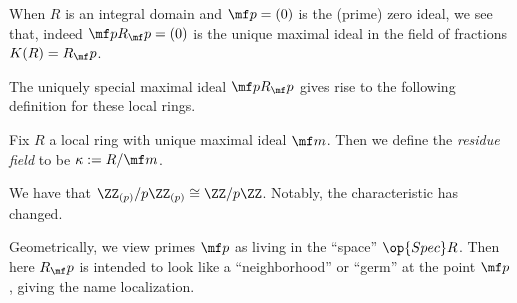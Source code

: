 \begin{example}
	When $R$ is an integral domain and $\mf p=(0)$ is the (prime) zero ideal, we see that, indeed $\mf pR_\mf p=(0)$ is the unique maximal ideal in the field of fractions $K(R)=R_\mf p$.
\end{example}
The uniquely special maximal ideal $\mf pR_\mf p$ gives rise to the following definition for these local rings.
\begin{definition}
	Fix $R$ a local ring with unique maximal ideal $\mf m$. Then we define the \textit{residue field} to be $\kappa:=R/\mf m$.
\end{definition}
\begin{example}
	We have that $\ZZ_{(p)}/p\ZZ_{(p)}\cong\ZZ/p\ZZ$. Notably, the characteristic has changed.
\end{example}
\begin{remark}
	Geometrically, we view primes $\mf p$ as living in the ``space'' $\op{Spec}R$. Then here $R_\mf p$ is intended to look like a ``neighborhood'' or ``germ'' at the point $\mf p$, giving the name localization.
\end{remark}

